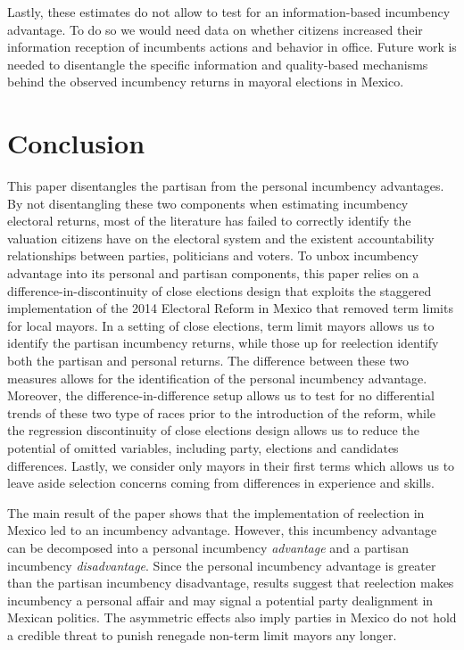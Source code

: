 Lastly, these estimates do not allow to test for an information-based incumbency advantage. To do so we would need data on whether citizens increased their information reception of incumbents actions and behavior in office. Future work is needed to disentangle the specific information and quality-based mechanisms behind the observed incumbency returns in mayoral elections in Mexico. 

  

\section{Conclusion} 

This paper disentangles the partisan from the personal incumbency advantages. By not disentangling these two components when estimating incumbency electoral returns, most of the literature has failed to correctly identify the valuation citizens have on the electoral system and the existent accountability relationships between parties, politicians and voters. To unbox incumbency advantage into its personal and partisan components, this paper relies on a difference-in-discontinuity of close elections design that exploits the staggered implementation of the 2014 Electoral Reform in Mexico that removed term limits for local mayors. In a setting of close elections, term limit mayors allows us to identify the partisan incumbency returns, while those up for reelection identify both the partisan and personal returns. The difference between these two measures allows for the identification of the personal incumbency advantage. Moreover, the difference-in-difference setup allows us to test for no differential trends of these two type of races prior to the introduction of the reform, while the regression discontinuity of close elections design allows us to reduce the potential of omitted variables, including party, elections and candidates differences. Lastly, we consider only mayors in their first terms which allows us to leave aside selection concerns coming from differences in experience and skills. 

The main result of the paper shows that the implementation of reelection in Mexico led to an incumbency advantage. However, this incumbency advantage can be decomposed into a personal incumbency \emph{advantage} and a partisan incumbency  \emph{disadvantage}. Since the personal incumbency advantage is greater than the partisan incumbency disadvantage, results suggest that reelection makes incumbency a personal affair and may signal a potential party dealignment in Mexican politics. The asymmetric effects also imply parties in Mexico do not hold a credible threat to punish renegade non-term limit mayors any longer. 

